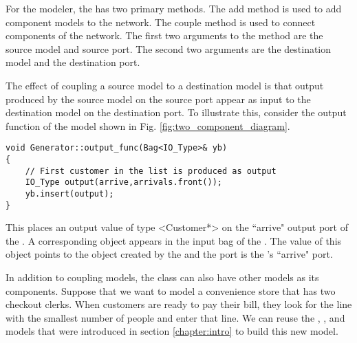 For the modeler, the  has two primary methods. The add method is used to add component models to the network. The couple method is used to connect components of the network. The
first two arguments to the  method are the source model and
source port. The second two arguments are the destination model and
the destination port. 

The effect of coupling a source model to a destination model is that
output produced by the source model on the source port appear
as input to the destination model on the destination port. To
illustrate this, consider the output function of the  model
shown in Fig. \ref{fig:two_component_diagram}.
\begin{verbatim}
void Generator::output_func(Bag<IO_Type>& yb)
{
    // First customer in the list is produced as output
    IO_Type output(arrive,arrivals.front());
    yb.insert(output);
}
\end{verbatim}

This places an output value of type \classname<Customer*> on the ``arrive" output port of the .  A corresponding  object appears in the input bag of the . The value of this  object points to the  object created by the  and the port is the 's ``arrive" port.

In addition to coupling  models, the  class can also have other  models as its components. Suppose that we want to model a convenience store
that has two checkout clerks. When customers are ready to pay their
bill, they look for the line with the smallest number of people and
enter that line. We can reuse the , , and 
models that were introduced in section \ref{chapter:intro} to build this new model. 

